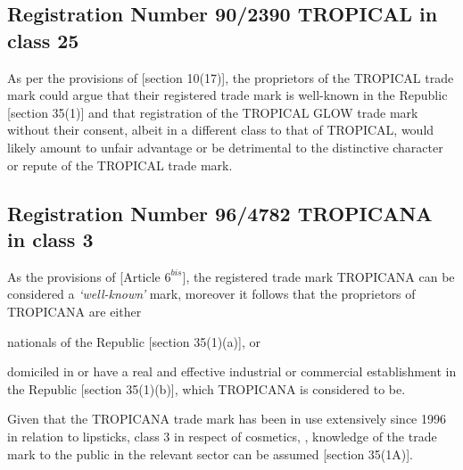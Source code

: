 \documentclass[11pt]{article}
\begin{document}
\subsection{Registration Number 90/2390 TROPICAL in class 25}
\label{sec:org4e25a4d}
As per the provisions of [section 10(17)]\cite{rsa93_tm_act}, the proprietors of
the TROPICAL trade mark could argue that their registered trade mark is
well-known in the Republic [section 35(1)]\cite{rsa93_tm_act} and that
registration of the TROPICAL GLOW trade mark without their consent, albeit in a
different class to that of TROPICAL, would likely amount to unfair advantage or
be detrimental to the distinctive character or repute of the TROPICAL trade
mark.
\subsection{Registration Number 96/4782 TROPICANA in class 3}
\label{sec:org1493c1d}
As the provisions of [Article
$6^{bis}$]\cite{wipo83_paris_conve_protect_ip}, the registered trade
mark TROPICANA can be considered a \emph{`well-known'} mark, moreover it follows that
the proprietors of TROPICANA are either \begin{enumerate*}[label=(\roman*)]
\item nationals of the Republic [section 35(1)(a)]\cite{rsa93_tm_act}, or \item
domiciled in or have a real and effective industrial or commercial establishment
in the Republic [section 35(1)(b)]\cite{rsa93_tm_act}, which TROPICANA is
considered to be.\end{enumerate*} Given that the TROPICANA trade mark has been
in use extensively since 1996 in relation to lipsticks, class 3 in respect of
cosmetics, \cite{wipo57_ncl}, knowledge of the trade mark to the public in the relevant sector can
be assumed [section 35(1A)]\cite{rsa93_tm_act}.\\
\end{document}
